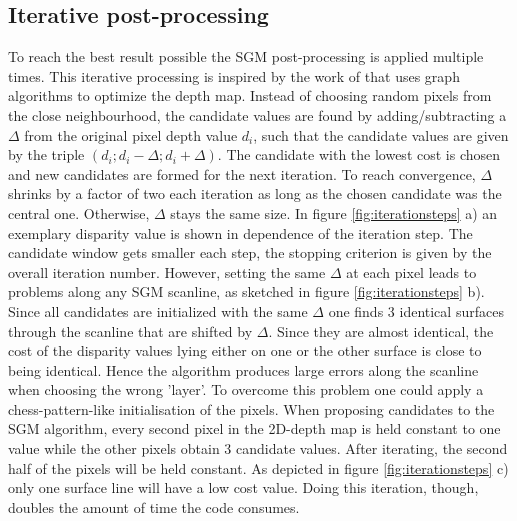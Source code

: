 \documentclass  [
  paper    = a4,
  BCOR     = 10mm,
  twoside,
  fontsize = 12pt,
  fleqn,
  toc      = bibnumbered,
  toc      = listofnumbered,
  numbers  = noendperiod,
  headings = normal,
  listof   = leveldown,
  version  = 3.03
]                                       {scrreprt}
\begin{document}
\subsection{Iterative post-processing}
\label{sec:iterative}
To reach the best result possible the SGM post-processing is applied multiple times. This iterative processing is inspired by the work of \cite{freist2018reconst} that uses graph algorithms to optimize the depth map. Instead of choosing random pixels from the close neighbourhood, the candidate values are found by adding/subtracting a $\Delta$ from the original pixel depth value $d_{i}$, such that the candidate values are given by the triple $(d_{i};d_{i}-\Delta;d_{i}+\Delta)$. The candidate with the lowest cost is chosen and new candidates are formed for the next iteration. To reach convergence, $\Delta$ shrinks by a factor of two each iteration as long as the chosen candidate was the central one. Otherwise, $\Delta$ stays the same size. In figure \ref{fig:iterationsteps} a) an exemplary disparity value is shown in dependence of the iteration step. The candidate window gets smaller each step, the stopping criterion is given by the overall iteration number. 
However, setting the same $\Delta$ at each pixel leads to problems along any SGM scanline, as sketched in figure \ref{fig:iterationsteps} b). Since all candidates are initialized with the same $\Delta$ one finds 3 identical surfaces through the scanline that are shifted by $\Delta$. Since they are almost identical, the cost of the disparity values lying either on one or the other surface is close to being identical. Hence the algorithm produces large errors along the scanline when choosing the wrong 'layer'. To overcome this problem one could apply a chess-pattern-like initialisation of the pixels. When proposing candidates to the SGM algorithm, every second pixel in the 2D-depth map is held constant to one value while the other pixels obtain 3 candidate values. After iterating, the second half of the pixels will be held constant. As depicted in figure \ref{fig:iterationsteps} c) only one surface line will have a low cost value. Doing this iteration, though, doubles the amount of time the code consumes. 
\end{document}
